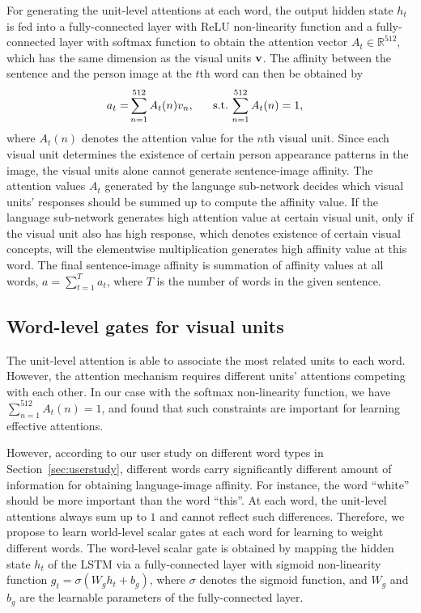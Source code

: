 For generating the unit-level attentions at each word, the output hidden state $h_t$ is fed into a fully-connected layer with ReLU non-linearity function and a fully-connected layer with softmax function to obtain the attention vector $A_t \in \mathbb{R}^{512}$, which has the same dimension as the visual units ${\bf v}$.
The affinity between the sentence and the person image at the $t$th word can then be obtained by
\vspace{-5pt}
\begin{align}
a_t =& \sum_{n=1}^{512}  A_t(n) v_n,~~~~~\textnormal{s.t.} \, \sum_{n=1}^{512} A_t(n) = 1,
\end{align}
where $A_t(n)$ denotes the attention value for the $n$th visual unit. Since each visual unit determines the existence of certain person appearance patterns in the image, the visual units alone cannot generate sentence-image affinity. The attention values $A_t$ generated by the language sub-network decides which visual units' responses should be summed up to compute the affinity value. If the language sub-network generates high attention value at certain visual unit, only if the visual unit also has high response, which denotes existence of certain visual concepts, will the elementwise multiplication generates high affinity value at this word. The final sentence-image affinity is summation of affinity values at all words, $a = \sum_{t=1}^T a_t$, where $T$ is the number of words in the given sentence.

\subsection{Word-level gates for visual units}
\label{sec:wordgate}

The unit-level attention is able to associate the most related units to each word. However, the attention mechanism requires different units' attentions competing with each other. In our case with the softmax non-linearity function, we have $\sum_{n=1}^{512} A_t(n) = 1$, and found that such constraints are important for learning effective attentions.

However, according to our user study on different word types in Section~\ref{sec:userstudy}, different words carry significantly different amount of information for obtaining language-image affinity. For instance, the word ``white'' should be more important than the word ``this''. At each word, the unit-level attentions always sum up to $1$ and cannot reflect such differences. Therefore, we propose to learn world-level scalar gates at each word for learning to weight different words. The word-level scalar gate is obtained by mapping the hidden state $h_t$ of the LSTM via a fully-connected layer with sigmoid non-linearity function $g_t = \sigma(W_g h_t + b_g)$,
where $\sigma$ denotes the sigmoid function, and $W_g$ and $b_g$ are the learnable parameters of the fully-connected layer.

